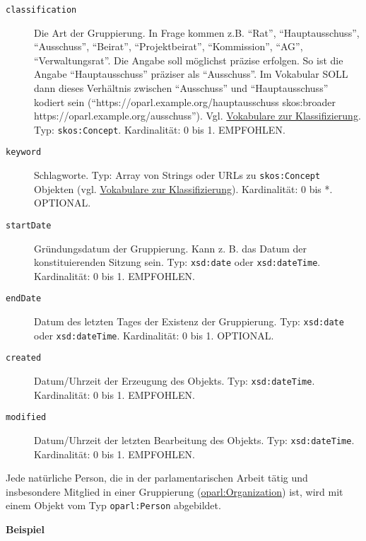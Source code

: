 \documentclass[,a4paper]{article}
\begin{document}
\begin{description}
\item[\texttt{classification}]
Die Art der Gruppierung. In Frage kommen z.B. ``Rat'',
``Hauptausschuss'', ``Ausschuss'', ``Beirat'', ``Projektbeirat'',
``Kommission'', ``AG'', ``Verwaltungsrat''. Die Angabe soll möglichst
präzise erfolgen. So ist die Angabe ``Hauptausschuss'' präziser als
``Ausschuss''. Im Vokabular SOLL dann dieses Verhältnis zwischen
``Ausschuss'' und ``Hauptausschuss'' kodiert sein
(``https://oparl.example.org/hauptausschuss skos:broader
https://oparl.example.org/ausschuss''). Vgl.
\hyperref[vokabulareux5fklassifizierung]{Vokabulare zur
Klassifizierung}. Typ: \texttt{skos:Concept}. Kardinalität: 0 bis 1.
EMPFOHLEN.
\item[\texttt{keyword}]
Schlagworte. Typ: Array von Strings oder URLs zu \texttt{skos:Concept}
Objekten (vgl. \hyperref[vokabulareux5fklassifizierung]{Vokabulare zur
Klassifizierung}). Kardinalität: 0 bis *. OPTIONAL.
\item[\texttt{startDate}]
Gründungsdatum der Gruppierung. Kann z. B. das Datum der
konstituierenden Sitzung sein. Typ: \texttt{xsd:date} oder
\texttt{xsd:dateTime}. Kardinalität: 0 bis 1. EMPFOHLEN.
\item[\texttt{endDate}]
Datum des letzten Tages der Existenz der Gruppierung. Typ:
\texttt{xsd:date} oder \texttt{xsd:dateTime}. Kardinalität: 0 bis 1.
OPTIONAL.
\item[\texttt{created}]
Datum/Uhrzeit der Erzeugung des Objekts. Typ: \texttt{xsd:dateTime}.
Kardinalität: 0 bis 1. EMPFOHLEN.
\item[\texttt{modified}]
Datum/Uhrzeit der letzten Bearbeitung des Objekts. Typ:
\texttt{xsd:dateTime}. Kardinalität: 0 bis 1. EMPFOHLEN.
\end{description}


Jede natürliche Person, die in der parlamentarischen Arbeit tätig und
insbesondere Mitglied in einer Gruppierung
(\hyperref[oparlux5forganization]{oparl:Organization}) ist, wird mit
einem Objekt vom Typ \texttt{oparl:Person} abgebildet.

\textbf{Beispiel}
\end{document}
